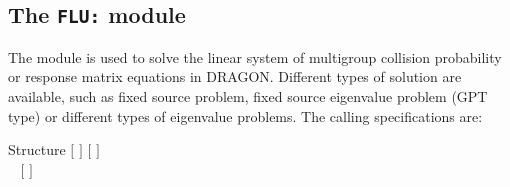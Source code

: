 \subsection{The {\tt FLU:} module}\label{sect:FLUData}

The  module is used to solve the linear system of multigroup collision
probability or response matrix equations in DRAGON. Different types of solution are
available, such as fixed source problem, fixed source eigenvalue problem (GPT type) or
different types of eigenvalue problems. The calling specifications are:

\begin{DataStructure}{Structure }
 \moc{:=}  $[$  $]$  
   $[$  $]$ \\
$~~~~[$   $]$ \moc{::} 
\end{DataStructure}

